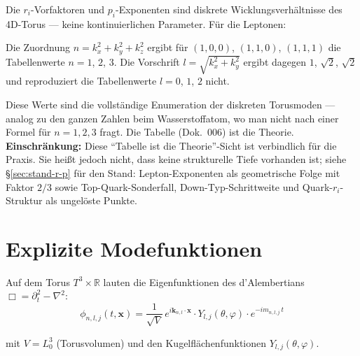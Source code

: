 Die $r_i$-Vorfaktoren und $p_i$-Exponenten sind diskrete Wicklungsverhältnisse
des 4D-Torus — keine kontinuierlichen Parameter. Für die Leptonen:

\begin{center}
{\footnotesize
{}
}
\end{center}
\noindent Die Zuordnung $n = k_x^2 + k_y^2 + k_z^2$ ergibt für $(1,0,0)$, $(1,1,0)$, $(1,1,1)$ die Tabellenwerte $n = 1$, $2$, $3$. Die Vorschrift $l = \sqrt{k_x^2 + k_y^2}$ ergibt dagegen $1$, $\sqrt2$, $\sqrt2$ und reproduziert die Tabellenwerte $l = 0$, $1$, $2$ nicht.

Diese Werte sind die vollständige Enumeration der diskreten Torusmoden —
analog zu den ganzen Zahlen beim Wasserstoffatom, wo man nicht nach einer
Formel für $n=1,2,3$ fragt. Die Tabelle (Dok.~006) ist die Theorie.
\textbf{Einschränkung:} Diese \enquote{Tabelle ist die Theorie}-Sicht
ist verbindlich für die Praxis. Sie heißt jedoch nicht, dass keine
strukturelle Tiefe vorhanden ist; siehe §\ref{sec:stand-r-p} für
den Stand: Lepton-Exponenten als geometrische Folge mit Faktor $2/3$
sowie Top-Quark-Sonderfall, Down-Typ-Schrittweite und Quark-$r_i$-Struktur
als ungelöste Punkte.

\section{Explizite Modefunktionen}

Auf dem Torus $T^3 \times \mathbb{R}$ lauten die Eigenfunktionen des
d'Alembertians $\Box = \partial_t^2 - \nabla^2$:
\begin{equation}
  \boxed{
    \phi_{n,l,j}(t,\mathbf{x})
    = \frac{1}{\sqrt{V}}\,
      e^{i\mathbf{k}_{n,l}\cdot\mathbf{x}} \cdot
      Y_{l,j}(\theta,\varphi) \cdot
      e^{-im_{n,l,j}\,t}
  }
\end{equation}

mit $V = L_0^3$ (Torusvolumen) und den Kugelflächenfunktionen
$Y_{l,j}(\theta,\varphi)$.

